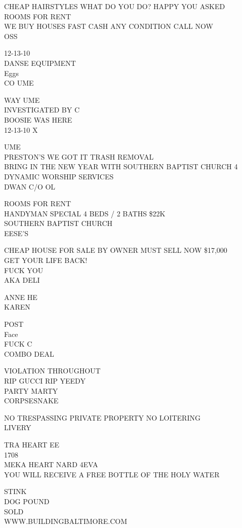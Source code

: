 \documentclass[10pt,letterpaper]{article}
\begin{document}
CHEAP HAIRSTYLES WHAT DO YOU DO? HAPPY YOU ASKED\\
ROOMS FOR RENT\\
WE BUY HOUSES FAST CASH ANY CONDITION CALL NOW\\
OSS

12{-}13{-}10\\
DANSE EQUIPMENT\\
Eggs\\
CO UME

WAY UME\\
INVESTIGATED BY C\\
BOOSIE WAS HERE\\
12{-}13{-}10 X

UME\\
PRESTON'S WE GOT IT TRASH REMOVAL\\
BRING IN THE NEW YEAR WITH SOUTHERN BAPTIST CHURCH 4 DYNAMIC WORSHIP SERVICES\\
DWAN C/O OL

ROOMS FOR RENT\\
HANDYMAN SPECIAL 4 BEDS / 2 BATHS \$22K\\
SOUTHERN BAPTIST CHURCH\\
EESE'S

CHEAP HOUSE FOR SALE BY OWNER MUST SELL NOW \$17,000\\
GET YOUR LIFE BACK!\\
FUCK YOU\\
AKA DELI

ANNE HE\\
KAREN

POST\\
Face\\
FUCK C\\
COMBO DEAL

VIOLATION THROUGHOUT\\
RIP GUCCI RIP YEEDY\\
PARTY MARTY\\
CORPSESNAKE

NO TRESPASSING PRIVATE PROPERTY NO LOITERING\\
LIVERY

TRA HEART EE\\
1708\\
MEKA HEART NARD 4EVA\\
YOU WILL RECEIVE A FREE BOTTLE OF THE HOLY WATER

STINK\\
DOG POUND\\
SOLD\\
WWW.BUILDINGBALTIMORE.COM
\end{document}
